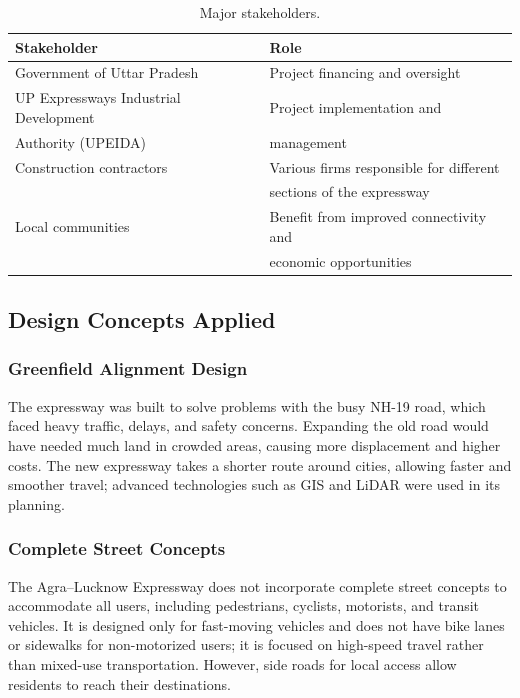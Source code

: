 \documentclass[11pt]{article}
\begin{document}
\begin{table}[H]
  \centering
  \caption{Major stakeholders.}
  \begin{tabular}{@{}ll@{}}
    \toprule
    \textbf{Stakeholder} & \textbf{Role} \\
    \midrule
    Government of Uttar Pradesh & Project financing and oversight \\
    UP Expressways Industrial Development & Project implementation and \\
    Authority (UPEIDA) & management \\
    Construction contractors & Various firms responsible for different \\
                             & sections of the expressway \\
    Local communities & Benefit from improved connectivity and \\
                       & economic opportunities \\
    \bottomrule
  \end{tabular}
\end{table}

\subsection{Design Concepts Applied}

\subsubsection{Greenfield Alignment Design}
The expressway was built to solve problems with the busy NH-19 road, which faced heavy traffic, delays,
and safety concerns. Expanding the old road would have needed much land in crowded areas, causing more
displacement and higher costs. The new expressway takes a shorter route around cities, allowing faster
and smoother travel; advanced technologies such as GIS and LiDAR were used in its planning.

\subsubsection{Complete Street Concepts}
The Agra--Lucknow Expressway does not incorporate complete street concepts to accommodate all users,
including pedestrians, cyclists, motorists, and transit vehicles. It is designed only for fast-moving
vehicles and does not have bike lanes or sidewalks for non-motorized users; it is focused on high-speed
travel rather than mixed-use transportation. However, side roads for local access allow residents to
reach their destinations.
\end{document}
